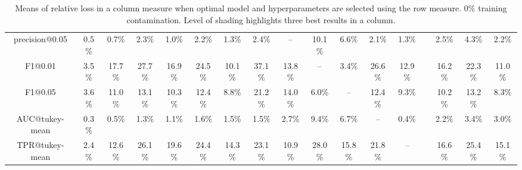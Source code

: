 \begin{table*}
{\begin{tabular}[h]{c c c c c c c c c c c c c c c c c }
  precision@0.05 & 0.5\% & 0.7\% & 2.3\% & 1.0\% & 2.2\% & 1.3\% & 2.4\% & -- & 10.1\% & 6.6\% & 2.1\% & 1.3\% &  & 2.5\% & 4.3\% & \cellcolor{gray!30}2.2\%  \\ 
  F1@0.01 & 3.5\% & 17.7\% & 27.7\% & 16.9\% & 24.5\% & 10.1\% & 37.1\% & 13.8\% & -- & \cellcolor{gray!45}3.4\% & 26.6\% & 12.9\% &  & 16.2\% & 22.3\% & 11.0\%  \\ 
  F1@0.05 & 3.6\% & 11.0\% & 13.1\% & 10.3\% & 12.4\% & 8.8\% & 21.2\% & 14.0\% & \cellcolor{gray!45}6.0\% & -- & 12.4\% & 9.3\% &  & 10.2\% & 13.2\% & 8.3\%  \\ 
  AUC@tukey-mean & \cellcolor{gray!15}0.3\% & \cellcolor{gray!15}0.5\% & 1.3\% & 1.1\% & 1.6\% & 1.5\% & \cellcolor{gray!30}1.5\% & 2.7\% & 9.4\% & 6.7\% & -- & \cellcolor{gray!45}0.4\% &  & 2.2\% & 3.4\% & 3.0\%  \\ 
  TPR@tukey-mean & 2.4\% & 12.6\% & 26.1\% & 19.6\% & 24.4\% & 14.3\% & 23.1\% & 10.9\% & 28.0\% & 15.8\% & 21.8\% & -- &  & 16.6\% & 25.4\% & 15.1\%  \\ 
 \end{tabular}
 }
 \caption{Means of relative loss in a column measure when optimal model and hyperparameters are selected using the row measure. 0\%  training contamination. Level of shading highlights three best results in a column.} 
 \label{tab:measure_comparison_full_0_by_models_tukey_mean} 
\end{table*}